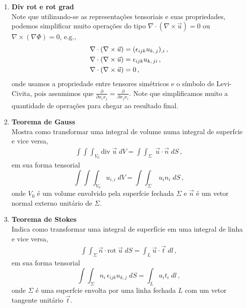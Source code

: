 \begin{enumerate}
\item{\bf Div rot e rot grad}\\
  Note que utilizando-se as representa\c{c}\~oes tensoriais e suas propriedades,
    podemos simplificar muito opera\c{c}\~oes do tipo $\nabla\cdot(\nabla\times\vec{u}) = 0$
    ou $\nabla\times(\nabla\Phi) = 0$, e.g.,
    \begin{align}
      \nabla\cdot(\nabla\times\vec{u}) &= (\epsilon_{ijk}u_{k,\thinspace j})_{,i}
      \, ,\\
      \nabla\cdot(\nabla\times\vec{u}) &= \epsilon_{ijk}u_{k,\thinspace ji} \, ,
      \\
      \nabla\cdot(\nabla\times\vec{u}) &= 0 \, ,
    \end{align}
    onde usamos a propriedade entre tensores sim\'etricos e o s\'imbolo de
    Levi-Civita, pois assumimos que $\frac{\partial}{\partial x_ix_j} =
    \frac{\partial}{\partial x_jx_i}$. Note que simplificamos muito a
    quantidade de opera\c{c}\~oes para chegar ao resultado final.
\\

\item {\bf Teorema de Gauss}\\
Mostra como transformar uma integral de volume numa integral de
superf\ih cie e vice versa,
\begin{eqnarray}
\int\!\!\!\int\!\!\!\int_{V_0} \mbox{div}\; \vec{u}\; dV = 
  \int\!\!\!\int_{\Sigma}\; \vec{u}\cdot\vec{n}\; dS \, ,
\end{eqnarray}
em sua forma tensorial
\begin{equation}
  \int\!\!\!\int\!\!\!\int_{V_0} u_{i,i}\; dV = 
  \int\!\!\!\int_{\Sigma}\; u_in_i \;dS \, ,
\end{equation}
onde $V_0$ \'e um volume envolvido pela superf\ih cie fechada
$\Sigma$ e $\vec{n}$ \'e um vetor normal externo unit\'ario de
$\Sigma$.

\item {\bf Teorema de Stokes}\\
Indica como transformar uma integral de superf\'icie em uma
integral de linha e vice versa,
\begin{eqnarray}
\int\!\!\!\int_{\Sigma}\vec{n}\cdot\mbox{rot}\; \vec{u}\; dS =
  \int_{L}\vec{u}\cdot\vec{t}\; dl\, ,
\end{eqnarray}
em sua forma tensorial
\begin{equation}
  \int\!\!\!\int_{\Sigma}n_i\,\epsilon_{ijk}u_{k,j}\; dS = \int_{L}u_it_i\; dl\,
  ,
\end{equation}
onde $\Sigma$ \'e uma superf\ih cie envolta por uma linha fechada
$L$ com um vetor tangente unit\'ario $\vec{t}$.

\end{enumerate}

